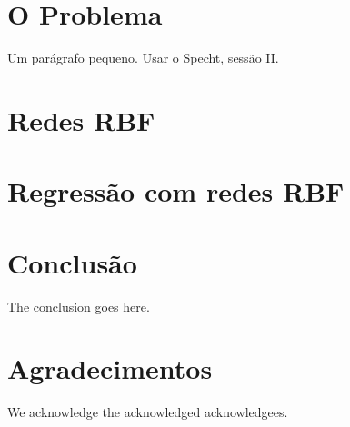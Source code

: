 \documentclass[conference]{IEEEtran}
\begin{document}
\section{O Problema}
\label{problema}

Um parágrafo pequeno. Usar o Specht, sessão II.

\section{Redes RBF}
\label{rbf}

\section{Regressão com redes RBF}
\label{resultados}

\section{Conclusão}
\label{conclusao}

The conclusion goes here.

\section*{Agradecimentos}
We acknowledge the acknowledged acknowledgees.




\end{document}
